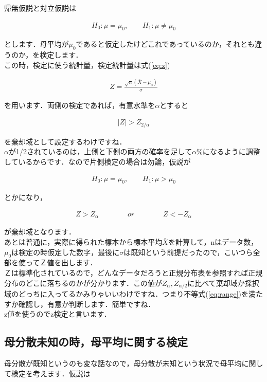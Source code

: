 \documentclass[11pt,a4paper,uplatex]{ujreport} 	%
\begin{document}
帰無仮説と対立仮説は

\begin{align}
  H_0 : \mu = \mu_0, \qquad H_1 : \mu \neq \mu_0
\end{align}

とします．母平均が$\mu_0$であると仮定したけどこれであっているのか，それとも違うのか，を検定します．\\

この時，検定に使う統計量，検定統計量は式(\ref{eq:z})

\begin{align}
  Z = \frac{\sqrt{n}(\bar{X}-\mu_0)}{\sigma}
\end{align}

を用います．両側の検定であれば，有意水準を$\alpha$とすると

\begin{align}
  |Z| > Z_{2/\alpha}
  \label{eq:range}
\end{align}

を棄却域として設定するわけですね．\\

$\alpha$が1/2されているのは，上側と下側の両方の確率を足して$\alpha$\%になるように調整しているからです．なので片側検定の場合は勿論，仮説が

\begin{align}
  H_0 : \mu = \mu_0, \qquad H_1 : \mu > \mu_0
\end{align}

とかになり，

\begin{align}
  Z > Z_\alpha \qquad \qquad or \qquad \qquad Z < - Z_\alpha
\end{align}

が棄却域となります．\\

あとは普通に，実際に得られた標本から標本平均$\bar{X}$を計算して，nはデータ数，$\mu_0$は検定の時仮定した数字，最後に$\sigma$は既知という前提だったので，こいつら全部を使ってＺ値を出します．\\

Ｚは標準化されているので，どんなデータだろうと正規分布表を参照すれば正規分布のどこに落ちるのかが分かります．この値が$Z_{\alpha}, Z_{\alpha/2}$に比べて棄却域か採択域のどっちに入ってるかみりゃいいわけですね．つまり不等式(\ref{eq:range})を満たすか確認し，有意か判断します．簡単ですね．\\

z値を使うのでz検定と言います．

\subsection{母分散未知の時，母平均に関する検定}
母分散が既知というのも変な話なので，母分散が未知という状況で母平均に関して検定を考えます．仮説は
\end{document}
